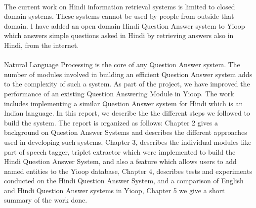 \paragraph{}
The current work on Hindi information retrieval systems is limited to closed domain systems. These systems cannot be used by people from outside that domain. I have added an open domain Hindi Question Answer system to Yioop which answers simple questions asked in Hindi by retrieving answers also in Hindi, from the internet. 

\paragraph{}
Natural Language Processing is the core of any Question Answer system. The number of modules involved in building an efficient Question Answer system adds to the complexity of such a system. As part of the project, we have improved the performance of an existing Question Answering Module \cite {patel2015question} in Yioop. The work includes implementing a similar Question Answer system for Hindi which is an Indian language. In this report, we describe the the different steps we followed to build the system. The report is organized as follows: Chapter 2 gives a background on Question Answer Systems and describes the different approaches used in developing such systems, Chapter 3, describes the individual modules  like part of speech tagger, triplet extractor which were implemented to build the Hindi Question Answer System, and also a feature which allows users to add named entities to the Yioop database, Chapter 4, describes tests and experiments conducted on the Hindi Question Answer System, and a comparison of English and Hindi Question Answer systems in Yioop, Chapter 5 we give a short summary of the work done.


